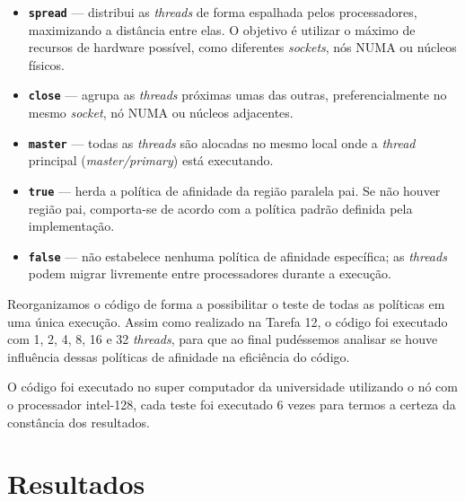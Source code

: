 \documentclass[a4paper, 12pt]{article}
\begin{document}
	\begin{itemize}
		\item \textbf{\texttt{spread}} — distribui as \textit{threads} de forma espalhada pelos processadores, maximizando a distância entre elas. O objetivo é utilizar o máximo de recursos de hardware possível, como diferentes \textit{sockets}, nós NUMA ou núcleos físicos.
		
		\item \textbf{\texttt{close}} — agrupa as \textit{threads} próximas umas das outras, preferencialmente no mesmo \textit{socket}, nó NUMA ou núcleos adjacentes.
		
		\item \textbf{\texttt{master}} — todas as \textit{threads} são alocadas no mesmo local onde a \textit{thread} principal (\textit{master/primary}) está executando.
		
		\item \textbf{\texttt{true}} — herda a política de afinidade da região paralela pai. Se não houver região pai, comporta-se de acordo com a política padrão definida pela implementação.
		
		\item \textbf{\texttt{false}} — não estabelece nenhuma política de afinidade específica; as \textit{threads} podem migrar livremente entre processadores durante a execução.
	\end{itemize}
	
	\hspace{0.62cm}Reorganizamos o código de forma a possibilitar o teste de todas as políticas em uma única execução. Assim como realizado na Tarefa 12, o código foi executado com 1, 2, 4, 8, 16 e 32 \textit{threads}, para que ao final pudéssemos analisar se houve influência dessas políticas de afinidade na eficiência do código.
	
	O código foi executado no super computador da universidade utilizando o nó com o processador intel-128, cada teste foi executado 6 vezes para termos a certeza da constância dos resultados.
	
	\section{Resultados}

	 
\end{document}
